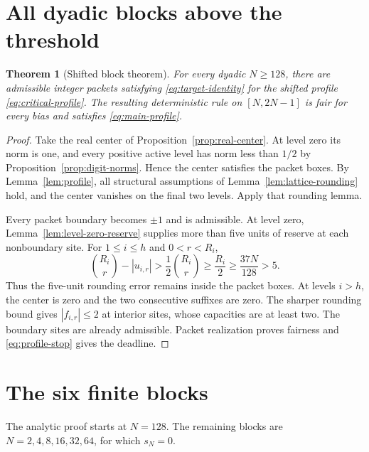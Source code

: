 \documentclass[11pt]{article}
\newtheorem{theorem}{Theorem}[section]
\theoremstyle{definition}
\theoremstyle{remark}
\begin{document}
\section{All dyadic blocks above the threshold}

\begin{theorem}[Shifted block theorem]\label{thm:large-block}
For every dyadic $N\ge128$, there are admissible integer packets satisfying
\eqref{eq:target-identity} for the shifted profile
\eqref{eq:critical-profile}. The resulting deterministic rule on
$[N,2N-1]$ is fair for every bias and satisfies \eqref{eq:main-profile}.
\end{theorem}
\begin{proof}
Take the real center of Proposition~\ref{prop:real-center}. At level zero
its norm is one, and every positive active level has norm less than
$1/2$ by Proposition~\ref{prop:digit-norms}. Hence the center satisfies
the packet boxes. By Lemma~\ref{lem:profile}, all structural assumptions
of Lemma~\ref{lem:lattice-rounding} hold, and the center vanishes on the
final two levels. Apply that rounding lemma.

Every packet boundary becomes $\pm1$ and is admissible. At level zero,
Lemma~\ref{lem:level-zero-reserve} supplies more than five units of
reserve at each nonboundary site. For $1\le i\le h$ and $0<r<R_i$,
\[
 \binom{R_i}{r}-|u_{i,r}|
 >\frac12\binom{R_i}{r}\ge\frac{R_i}{2}
 \ge\frac{37N}{128}>5.
\]
Thus the five-unit rounding error remains inside the packet boxes.
At levels $i>h$, the center is zero and the two consecutive suffixes
are zero. The sharper rounding bound gives $|f_{i,r}|\le2$ at interior
sites, whose capacities are at least two. The boundary sites are already
admissible. Packet realization proves fairness and
\eqref{eq:profile-stop} gives the deadline.
\end{proof}

\section{The six finite blocks}\label{sec:finite}

The analytic proof starts at $N=128$. The remaining blocks are
$N=2,4,8,16,32,64$, for which $s_N=0$.
\end{document}
